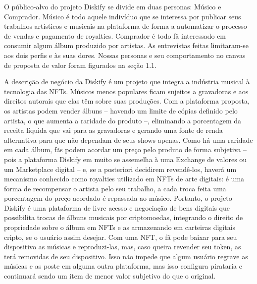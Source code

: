\documentclass[onecolumn,12pt]{asme2ej}
\begin{document}
O público-alvo do projeto Diskify se divide em duas personas: Músico e Comprador. Músico é todo aquele indivíduo que se interessa por publicar seus trabalhos artísticos e musicais na plataforma de forma a automatizar o processo de vendas e pagamento de royalties. Comprador é todo fã interessado em consumir algum álbum produzido por artistas. As entrevistas feitas limitaram-se aos dois perfis e às suas dores. Nossas personas e seu comportamento no canvas de proposta de valor foram figurados na seção 1.1.

A descrição de negócio da Diskify é um projeto que integra a indústria musical à tecnologia das NFTs. Músicos menos populares ficam sujeitos a gravadoras e aos direitos autorais que elas têm sobre suas produções. Com a plataforma proposta, os artistas podem vender álbuns – havendo um limite de cópias definido pelo artista, o que aumenta a raridade do produto –, eliminando a porcentagem da receita líquida que vai para as gravadoras e gerando uma fonte de renda alternativa para que não dependam de seus shows apenas. Como há uma raridade em cada álbum, fãs podem acordar um preço pelo produto de forma subjetiva – pois a plataforma Diskify em muito se assemelha à uma Exchange de valores ou um Marketplace digital – e, se a posteriori decidirem revendê-los, haverá um mecanismo conhecido como royalties utilizado em NFTs de arte digitais: é uma forma de recompensar o artista pelo seu trabalho, a cada troca feita uma porcentagem do preço acordado é repassada ao músico. Portanto, o projeto Diskify é uma plataforma de livre acesso e negociação de bens digitais que possibilita trocas de álbuns musicais por criptomoedas, integrando o direito de propriedade sobre o álbum em NFTs e as armazenando em carteiras digitais cripto, se o usuário assim desejar. Com uma NFT, o fã pode baixar para seu dispositivo as músicas e reproduzi-las, mas, caso queira revender seu token, as terá removidas de seu dispositivo. Isso não impede que algum usuário regrave as músicas e as poste em alguma outra plataforma, mas isso configura pirataria e continuará sendo um item de menor valor subjetivo do que o original. 
\end{document}
